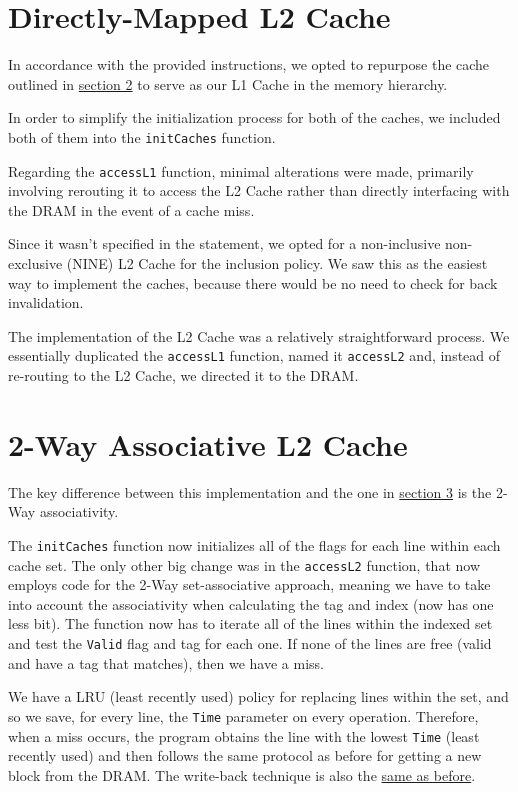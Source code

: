 \documentclass[12pt]{article}
\begin{document}
    \section{Directly-Mapped L2 Cache} \label{S3}

    In accordance with the provided instructions, we opted to repurpose the cache outlined in \hyperref[S2]{section 2} to serve as our L1 Cache in the memory hierarchy.

    In order to simplify the initialization process for both of the caches, we included both of them into the \texttt{initCaches}
    function.

    Regarding the \texttt{accessL1} function, minimal alterations were made, primarily involving rerouting it to access the L2 Cache rather than directly
    interfacing with the DRAM in the event of a cache miss.

    Since it wasn't specified in the statement, we opted for a non-inclusive non-exclusive (NINE) L2 Cache for the inclusion policy.
    We saw this as the easiest way to implement the caches, because there would be no need to check for back invalidation.

    The implementation of the L2 Cache was a relatively straightforward process. We essentially duplicated the \texttt{accessL1} function, named it \texttt{accessL2} and,
    instead of re-routing to the L2 Cache, we directed it to the DRAM.

    \section{2-Way Associative L2 Cache}

    The key difference between this implementation and the one in \hyperref[S3]{section 3} is the 2-Way associativity.

    The \texttt{initCaches} function now initializes all of the flags for each line within each cache set. The only other big change was in the \texttt{accessL2} function,
    that now employs code for the 2-Way set-associative approach, meaning we have to take into account the associativity when calculating the tag and index (now has one less bit).
    The function now has to iterate all of the lines within the indexed set and test the \texttt{Valid} flag and tag for each one. If none of the lines are free
    (valid and have a tag that matches), then we have a miss.

    We have a LRU (least recently used) policy for replacing lines within the set, and so we save, for every line, the \texttt{Time} parameter on every operation.
    Therefore, when a miss occurs, the program obtains the line with the lowest \texttt{Time} (least recently used) and then follows the same protocol as before for getting a new
    block from the DRAM. The write-back technique is also the \hyperref[WBT]{same as before}.
\end{document}
